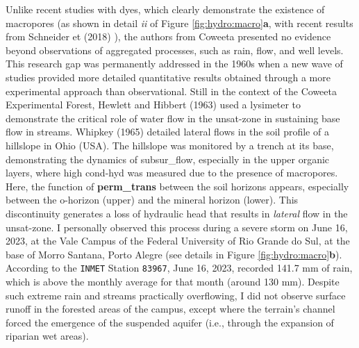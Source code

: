 \documentclass[./main_en.tex]{subfiles}
\begin{document}
\par Unlike recent studies with dyes, which clearly demonstrate the existence of macropores (as shown in detail \textit{ii} of Figure \ref{fig:hydro:macro}\textbf{a}, with recent results from Schneider et  (2018) \cite{Schneider2018}), the authors from Coweeta presented no evidence beyond observations of aggregated processes, such as rain, flow, and well levels. This research gap was permanently addressed in the 1960s when a new wave of studies provided more detailed quantitative results obtained through a more experimental approach than observational. Still in the context of the Coweeta Experimental Forest, Hewlett and Hibbert (1963) \cite{Hewlett1963} used a lysimeter to demonstrate the critical role of water flow in the \gls{unsat-zone} in sustaining base flow in streams. Whipkey (1965) \cite{Whipkey1965} detailed lateral flows in the soil profile of a hillslope in Ohio (USA). The hillslope was monitored by a trench at its base, demonstrating the dynamics of \gls{subsur_flow}, especially in the upper organic layers, where high \gls{cond-hyd} was measured due to the presence of macropores. Here, the function of \textbf{\gls{perm_trans}} between the soil horizons appears, especially between the \gls{o-horizon} (upper) and the mineral horizon (lower). This discontinuity generates a loss of hydraulic head that results in \textit{lateral} flow in the \gls{unsat-zone}. I personally observed this process during a severe storm on June 16, 2023, at the Vale Campus of the Federal University of Rio Grande do Sul, at the base of Morro Santana, Porto Alegre (see details in Figure \ref{fig:hydro:macro}\textbf{b}). According to the \texttt{INMET} Station \texttt{83967}, June 16, 2023, recorded 141.7 mm of rain, which is above the monthly average for that month (around 130 mm). Despite such extreme rain and streams practically overflowing, I did not observe surface runoff in the forested areas of the campus, except where the terrain's channel forced the emergence of the suspended aquifer (i.e., through the expansion of riparian wet areas).
\end{document}
